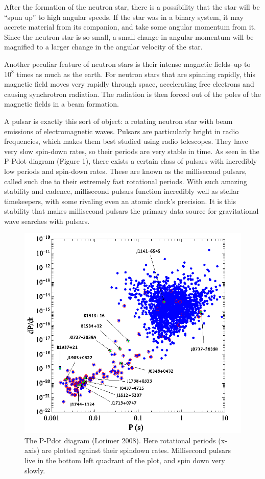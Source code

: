 \documentclass[12pt]{article}
\begin{document}
After the formation of the neutron star, there is a possibility that the star
will be ``spun up'' to high angular speeds. If the star was in a binary system,
it may accrete material from its companion, and take some angular momentum from
it. Since the neutron star is so small, a small change in angular momentum will
be magnified to a larger change in the angular velocity of the star.

Another peculiar feature of neutron stars is their intense magnetic fields--up
to $10^8$ times as much as the earth. For neutron stars that are spinning rapidly,
this magnetic field moves very rapidly through space, accelerating free
electrons and causing synchrotron radiation. The radiation is then forced out of
the poles of the magnetic fields in a beam formation. 

A pulsar is exactly this sort of object: a rotating neutron star with beam
emissions of electromagnetic waves. Pulsars are particularly bright in radio
frequencies, which makes them best studied using radio telescopes. They have
very slow spin-down rates, so their periods are very stable in time.
As seen in the P-Pdot diagram (Figure 1), there exists a certain class of
pulsars with incredibly low periods and spin-down rates. These are known as the
millisecond pulsars, called such due to their extremely fast rotational periods.
With such amazing stability and cadence, millisecond pulsars function incredibly
well as stellar timekeepers, with some rivaling even an atomic clock's precision. It
is this stability that makes millisecond pulsars the primary data source for
gravitational wave searches with pulsars.

\begin{figure}
\caption{The P-Pdot diagram (Lorimer 2008). Here rotational periods (x-axis) are
plotted against their spindown rates. Millisecond pulsars live in the bottom
left quadrant of the plot, and spin down very slowly.}
\includegraphics[width=\textwidth]{./figures/fig_P_Pdot_with_names.png}
\end{figure}
\end{document}
